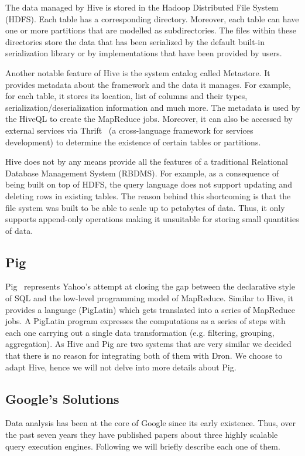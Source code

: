 \documentclass[11pt,a4paper,twoside]{report}
\begin{document}
The data managed by Hive is stored in the Hadoop Distributed File System (HDFS). Each table has a corresponding directory. Moreover, each table can have one or more partitions that are modelled as subdirectories. The files within these directories store the data that has been serialized by the default built-in serialization library or by implementations that have been provided by users.


Another notable feature of Hive is the system catalog called Metastore. It provides metadata about the framework and the data it manages. For example, for each table, it stores its location, list of columns and their types, serialization/deserialization information and much more. The metadata is used by the HiveQL to create the MapReduce jobs. Moreover, it can also be accessed by external services via Thrift~\cite{Thrift} (a cross-language framework for services development) to determine the existence of certain tables or partitions.


Hive does not by any means provide all the features of a traditional Relational Database Management System (RBDMS). For example, as a consequence of being built on top of HDFS, the query language does not support updating and deleting rows in existing tables. The reason behind this shortcoming is that the file system was built to be able to scale up to petabytes of data. Thus, it only supports append-only operations making it unsuitable for storing small quantities of data.

\subsection{Pig}
Pig~\cite{Pig} represents Yahoo's attempt at closing the gap between the declarative style of SQL and the low-level programming model of MapReduce. Similar to Hive, it provides a language (PigLatin) which gets translated into a series of MapReduce jobs. A PigLatin program expresses the computations as a series of steps with each one carrying out a single data transformation (e.g. filtering, grouping, aggregation). As Hive and Pig are two systems that are very similar we decided that there is no reason for integrating both of them with Dron. We choose to adapt Hive, hence we will not delve into more details about Pig.

\subsection{Google's Solutions}
Data analysis has been at the core of Google since its early existence. Thus, over the past seven years they have published papers about three highly scalable query execution engines. Following we will briefly describe each one of them.
\end{document}
